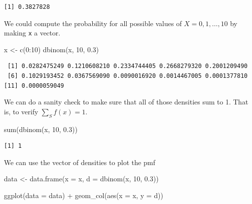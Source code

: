 \documentclass[
  letterpaper,
  DIV=11,
  numbers=noendperiod]{scrartcl}
\newenvironment{Shaded}{\begin{snugshade}}{\end{snugshade}}
\newcommand{\AttributeTok}[1]{\textcolor[rgb]{0.40,0.45,0.13}{#1}}
\newcommand{\DecValTok}[1]{\textcolor[rgb]{0.68,0.00,0.00}{#1}}
\newcommand{\FloatTok}[1]{\textcolor[rgb]{0.68,0.00,0.00}{#1}}
\newcommand{\FunctionTok}[1]{\textcolor[rgb]{0.28,0.35,0.67}{#1}}
\newcommand{\NormalTok}[1]{\textcolor[rgb]{0.00,0.23,0.31}{#1}}
\newcommand{\OtherTok}[1]{\textcolor[rgb]{0.00,0.23,0.31}{#1}}
\newcommand{\SpecialCharTok}[1]{\textcolor[rgb]{0.37,0.37,0.37}{#1}}
\begin{document}
\begin{verbatim}
[1] 0.3827828
\end{verbatim}

We could compute the probability for all possible values of
\(X = 0, 1, \dots , 10\) by making \texttt{x} a vector.

\begin{Shaded}
\begin{Highlighting}[]
\NormalTok{x }\OtherTok{\textless{}{-}} \FunctionTok{c}\NormalTok{(}\DecValTok{0}\SpecialCharTok{:}\DecValTok{10}\NormalTok{)}
\FunctionTok{dbinom}\NormalTok{(x, }\DecValTok{10}\NormalTok{, }\FloatTok{0.3}\NormalTok{)}
\end{Highlighting}
\end{Shaded}

\begin{verbatim}
 [1] 0.0282475249 0.1210608210 0.2334744405 0.2668279320 0.2001209490
 [6] 0.1029193452 0.0367569090 0.0090016920 0.0014467005 0.0001377810
[11] 0.0000059049
\end{verbatim}

We can do a sanity check to make sure that all of those densities sum to
1. That is, to verify \(\sum_S f(x) = 1\).

\begin{Shaded}
\begin{Highlighting}[]
\FunctionTok{sum}\NormalTok{(}\FunctionTok{dbinom}\NormalTok{(x, }\DecValTok{10}\NormalTok{, }\FloatTok{0.3}\NormalTok{))}
\end{Highlighting}
\end{Shaded}

\begin{verbatim}
[1] 1
\end{verbatim}

We can use the vector of densities to plot the pmf

\begin{Shaded}
\begin{Highlighting}[]
\NormalTok{data }\OtherTok{\textless{}{-}} \FunctionTok{data.frame}\NormalTok{(}\AttributeTok{x =}\NormalTok{ x,}
                   \AttributeTok{d =} \FunctionTok{dbinom}\NormalTok{(x, }\DecValTok{10}\NormalTok{, }\FloatTok{0.3}\NormalTok{))}

\FunctionTok{ggplot}\NormalTok{(}\AttributeTok{data =}\NormalTok{ data) }\SpecialCharTok{+}
  \FunctionTok{geom\_col}\NormalTok{(}\FunctionTok{aes}\NormalTok{(}\AttributeTok{x =}\NormalTok{ x, }\AttributeTok{y =}\NormalTok{ d))}
\end{Highlighting}
\end{Shaded}
\end{document}
